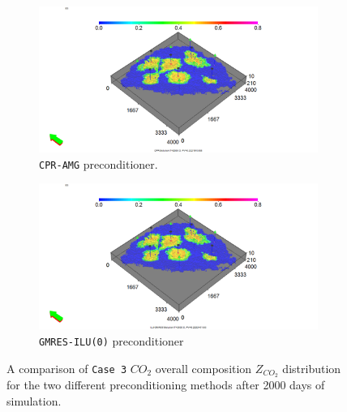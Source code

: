 \begin{figure}
\centering
\begin{subfigure}{.5\textwidth}
  \centering
  \includegraphics[width=1.3\linewidth]{figures/case3_cpr_sgas.png}
  \caption{\texttt{CPR-AMG} preconditioner.}
\end{subfigure}%
\begin{subfigure}{.5\textwidth}
  \centering
  \includegraphics[width=1.3\linewidth]{figures/case3_ilu_sgas.png}
  \caption{\texttt{GMRES-ILU(0)} preconditioner}
\end{subfigure}
\caption{A comparison of \texttt{Case 3} $CO_{2}$ overall composition $Z_{CO_{2}}$ distribution for the two different preconditioning methods after 2000 days of simulation.}
\label{case3z}
\end{figure}

